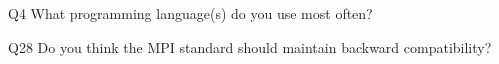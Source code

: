 \begin{description}%
\item{Q4} What programming language(s) do you use most often?%
\item{Q28} Do you think the MPI standard should maintain backward compatibility?%
\end{description}%
